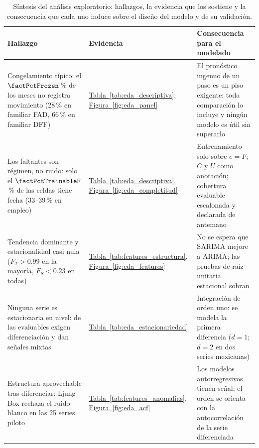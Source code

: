 \documentclass[12pt,letterpaper]{report}
\begin{document}
\begin{table}[htbp]
\centering
\footnotesize
\caption[Síntesis del análisis exploratorio]{Síntesis del análisis exploratorio: hallazgos, la
evidencia que los sostiene y la consecuencia que cada uno induce sobre el diseño del modelo y de
su validación.}
\label{tab:eda_sintesis}
\begin{tabular}{>{\raggedright\arraybackslash}p{5.4cm}>{\raggedright\arraybackslash}p{2.3cm}>{\raggedright\arraybackslash}p{5.7cm}}
\toprule
\rowcolor{uacjblue!15}
\textbf{Hallazgo} & \textbf{Evidencia} & \textbf{Consecuencia para el modelado} \\ \midrule
Congelamiento típico: el $\factPctFrozen$\,\% de los meses no registra movimiento (28\,\% en
familiar FAD, 66\,\% en familiar DFF) &
\hyperref[tab:eda_descriptiva]{Tabla~\ref*{tab:eda_descriptiva}}, \hyperref[fig:eda_panel]{Figura~\ref*{fig:eda_panel}} &
El pronóstico ingenuo de un paso es un piso exigente: toda comparación lo incluye y ningún modelo
es útil sin superarlo \\
Los faltantes son régimen, no ruido: solo el $\factPctTrainableF$\,\% de las celdas tiene fecha
(33--39\,\% en empleo) &
\hyperref[tab:eda_descriptiva]{Tabla~\ref*{tab:eda_descriptiva}}, \hyperref[fig:eda_completitud]{Figura~\ref*{fig:eda_completitud}} &
Entrenamiento solo sobre $e=F$; $C$ y $U$ como anotación; cobertura evaluable escalonada y
declarada de antemano \\
Tendencia dominante y estacionalidad casi nula ($F_T>0.99$ en la mayoría, $F_S<0.23$ en todas) &
\hyperref[tab:features_estructura]{Tabla~\ref*{tab:features_estructura}}, \hyperref[fig:eda_features]{Figura~\ref*{fig:eda_features}} &
No se espera que SARIMA mejore a ARIMA; las pruebas de raíz unitaria estacional sobran \\
Ninguna serie es estacionaria en nivel: \factStationarityDifference{} de las
\factNSeriesEvaluable{} evaluables exigen diferenciación y \factStationarityMixed{} dan señales
mixtas &
\hyperref[tab:eda_estacionariedad]{Tabla~\ref*{tab:eda_estacionariedad}} &
Integración de orden uno: se modela la primera diferencia ($d=1$; $d=2$ en dos series
mexicanas) \\
Estructura aprovechable tras diferenciar: Ljung-Box rechaza el ruido blanco en las 25 series
piloto &
\hyperref[tab:features_anomalias]{Tabla~\ref*{tab:features_anomalias}}, \hyperref[fig:eda_acf]{Figura~\ref*{fig:eda_acf}} &
Los modelos autorregresivos tienen señal; el orden se orienta con la autocorrelación de la serie
diferenciada \\

\end{tabular}
\end{table}
\end{document}
